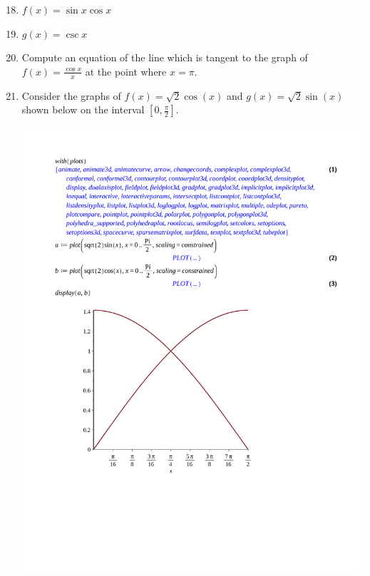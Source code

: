 \documentclass[12pt]{article}
\newif\ifans
\begin{document}

\begin{enumerate}
\setcounter{enumi}{17}

\item $f(x) = \sin{x}\cos{x}$ 

\ifans{\fbox{$\frac{\pi}{4}, \frac{3\pi}{4}, \frac{5\pi}{4}, \frac{7\pi}{4}$}} \fi

\item $g(x) = \csc{x}$ 

\ifans{\fbox{$\frac{\pi}{2}, \frac{3\pi}{2}$}} \fi

\item Compute an equation of the line which is tangent to the graph of $f(x)=\frac{\cos{x}}{x}$ at the point where $x=\pi$.

\ifans{\fbox{$y=\frac{1}{\pi^2}x-\frac{2}{\pi}$}} \fi

\item Consider the graphs of $f(x)=\sqrt{2}\cos(x)$ and $g(x)=\sqrt{2}\sin(x)$ shown below on the interval $\left[0,\frac{\pi}{2}\right]$.

\begin{center}
\includegraphics[scale=0.4]{graph.pdf}
\end{center}


\end{enumerate}
\end{document}
